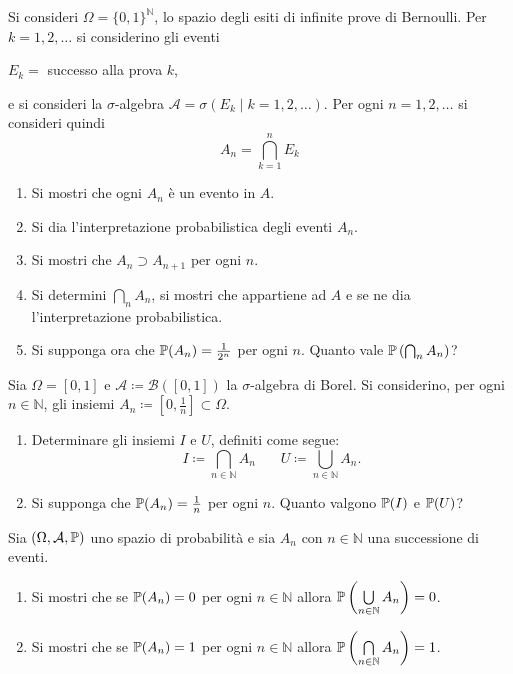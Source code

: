 \Esercizio{}

Si consideri $\Omega =\{0,1\}^{\mathbb{N}}$, lo spazio degli esiti di infinite prove di Bernoulli. Per $k=1,2,\dots $ si considerino gli eventi
\begin{center}
	$E_{k} =$ successo alla prova $k$,
\end{center}
e si consideri la $\sigma $-algebra $\mathcal{A} =\sigma ( E_{k} \mid k=1,2,\dots )$. Per ogni $n=1,2,\dots $ si consideri quindi
\begin{equation*}
	A_{n} =\bigcap _{k=1}^{n} E_{k}
\end{equation*}
\begin{enumerate}
	\item Si mostri che ogni $A_{n}$ è un evento in $A$.
	\item Si dia l'interpretazione probabilistica degli eventi $A_{n}$.
	\item Si mostri che $A_{n} \supset A_{n+1}$ per ogni $n$.
	\item Si determini $\bigcap _{n} A_{n}$, si mostri che appartiene ad $A$ e se ne dia l'interpretazione probabilistica.
	\item Si supponga ora che $\mathbb{P}( A_{n}) =\frac{1}{2^{n}}$ per ogni $n$. Quanto vale $\mathbb{P}\left(\bigcap_{n} A_{n}\right)$?
\end{enumerate}

\Esercizio{}

Sia $\Omega =[ 0,1]$ e $\mathcal{A} \coloneqq \mathcal{B}([ 0,1])$ la $\sigma $-algebra di Borel. Si considerino, per ogni $n\in \mathbb{N}$, gli insiemi $A_{n} \coloneqq \left[ 0,\frac{1}{n}\right] \subset \Omega $.
\begin{enumerate}
	\item Determinare gli insiemi $I$ e $U$, definiti come segue:
	\begin{equation*}
		I\coloneqq \bigcap _{n\in \mathbb{N}} A_{n} \ \ \ \ \ \ \ \ U\coloneqq \bigcup _{n\in \mathbb{N}} A_{n} .
	\end{equation*}
	\item Si supponga che $\mathbb{P}( A_{n}) =\frac{1}{n}$ per ogni $n$. Quanto valgono $\mathbb{P}( I)$ e $\mathbb{P}( U)$?
\end{enumerate}

\Esercizio{$\star$}

Sia $( \Omega ,\mathcal{A} ,\mathbb{P})$ uno spazio di probabilità e sia $A_{n}$ con $n\in \mathbb{N}$ una successione di eventi.
\begin{enumerate}
	\item Si mostri che se $\mathbb{P}( A_{n}) =0$ per ogni $n\in \mathbb{N}$ allora $\mathbb{P}\left(\bigcup\limits _{n\in \mathbb{N}} A_{n}\right) =0$.
	\item Si mostri che se $\mathbb{P}( A_{n}) =1$ per ogni $n\in \mathbb{N}$ allora $\mathbb{P}\left(\bigcap\limits _{n\in \mathbb{N}} A_{n}\right) =1$.
\end{enumerate}


